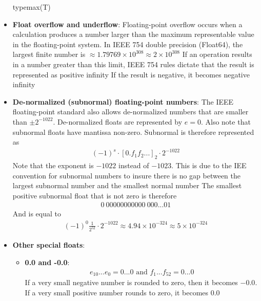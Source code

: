 \documentclass{report}
\begin{document}
\begin{itemize}
\begin{jlcode}
        typemax(T)
        \end{jlcode}
    \item \textbf{Float overflow and underflow}: Floating-point overflow occurs when a calculation produces a number larger than the maximum representable value in the floating-point system. In IEEE 754 double precision (Float64), the largest finite number is $\approx 1.79769 \times 10^{308} \approx 2\times 10^{308}$
        \bigbreak \noindent 
        If an operation results in a number greater than this limit, IEEE 754 rules dictate that the result is represented as positive infinity
        \bigbreak \noindent 
        If the result is negative, it becomes negative infinity
    \item \textbf{De-normalized (subnormal) floating-point numbers}: The IEEE floating-point standard also allows de-normalized numbers that are smaller than $\pm 2^{-1022}$. De-normalized floats are represented by $e=0$. Also note that subnormal floats have mantissa non-zero. Subnormal is therefore represented as
        \begin{align*}
            (-1)^{s} \cdot [0.f_{1}f_{2}...]_{2} \cdot 2^{-1022}
        \end{align*}
        Note that the exponent is $-1022$ instead of $-1023$. This is due to the IEE convention for subnormal numbers to insure there is no gap between the largest subnormal number and the smallest normal number
        \bigbreak \noindent 
        The smallest positive subnormal float that is not zero is therefore
        \begin{align*}
            0 \ 00000000000 \ 000...01
        \end{align*}
        And is equal to 
        \begin{align*}
            (-1)^{0} \frac{1}{2^{52}} \cdot 2^{-1022} \approx  4.94 \times 10^{-324} \approx 5 \times 10^{-324}
        \end{align*}
    \item \textbf{Other special floats}:
        \begin{itemize}
            \item \textbf{0.0 and -0.0}:
                \begin{align*}
                    e_{10}...e_{0} = 0... 0 \text{ and } f_{1}...f_{52} = 0...0
                \end{align*}
                \bigbreak \noindent 
                If a very small negative number is rounded to zero, then it becomes $-0.0$. If a very small positive number rounds to zero, it becomes $0.0$

\end{itemize}
\end{itemize}
\end{document}
